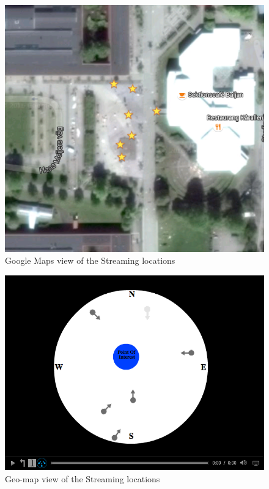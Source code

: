 \begin{figure}[ht!]
\begin{center}
	\includegraphics[scale=0.64]{Google_Maps.png}
	\caption{Google Maps view of the Streaming locations}
	\label{fig:googlemaps}
\end{center}
\end{figure}

\begin{figure}[ht!]
\begin{center}
	\includegraphics[scale=0.37]{TestfallGeomap.png}
	\caption{Geo-map view of the Streaming locations}
	\label{fig:testfallgeomap}
\end{center}
\end{figure}

